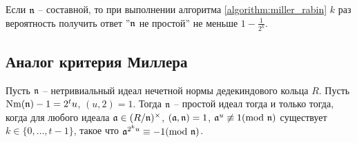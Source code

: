 \documentclass[_dissertation.tex]{subfiles}
\begin{document}
\begin{remark}
    Если $\mathfrak{n}$ -- составной, то при выполнении алгоритма \ref{algorithm:miller_rabin} $k$ раз вероятность получить ответ ''$\mathfrak{n}$ не простой'' не меньше $1 - \frac{1}{2^k}$.
\end{remark}

\subsection{Аналог критерия Миллера}

\begin{theorem}\label{theorem:miller_criteria}
    Пусть $\mathfrak{n}$ -- нетривиальный идеал нечетной нормы дедекиндового кольца $R$.
    Пусть $\textrm{Nm}(\mathfrak{n}) - 1 = 2^t u$, $(u, 2) = 1$.
    Тогда $\mathfrak{n}$ -- простой идеал тогда и только тогда, когда для любого идеала $\mathfrak{a} \in (R/\mathfrak{n})^{\times}$, $(\mathfrak{a}, \mathfrak{n}) = 1$, $\mathfrak{a}^u \not\equiv 1(\textrm{mod } \mathfrak{n})$ существует $k\in \{0, \dots, t-1\}$, такое что $\mathfrak{a}^{2^{k}u} \equiv -1 (\textrm{mod } \mathfrak{n})$.
\end{theorem}
\end{document}
